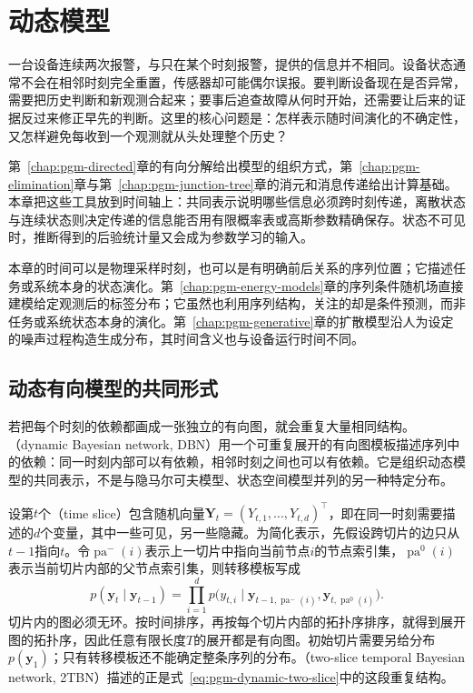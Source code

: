 \chapter{动态模型}
\label{chap:pgm-dynamic}

一台设备连续两次报警，与只在某个时刻报警，提供的信息并不相同。设备状态通常不会在相邻时刻完全重置，传感器却可能偶尔误报。要判断设备现在是否异常，需要把历史判断和新观测合起来；要事后追查故障从何时开始，还需要让后来的证据反过来修正早先的判断。这里的核心问题是：怎样表示随时间演化的不确定性，又怎样避免每收到一个观测就从头处理整个历史？

第~\ref{chap:pgm-directed}章的有向分解给出模型的组织方式，第~\ref{chap:pgm-elimination}章与第~\ref{chap:pgm-junction-tree}章的消元和消息传递给出计算基础。本章把这些工具放到时间轴上：共同表示说明哪些信息必须跨时刻传递，离散状态与连续状态则决定传递的信息能否用有限概率表或高斯参数精确保存。状态不可见时，推断得到的后验统计量又会成为参数学习的输入。

本章的时间可以是物理采样时刻，也可以是有明确前后关系的序列位置；它描述任务或系统本身的状态演化。第~\ref{chap:pgm-energy-models}章的序列条件随机场直接建模给定观测后的标签分布；它虽然也利用序列结构，关注的却是条件预测，而非任务或系统状态本身的演化。第~\ref{chap:pgm-generative}章的扩散模型沿人为设定的噪声过程构造生成分布，其时间含义也与设备运行时间不同。

\section{动态有向模型的共同形式}
\label{sec:pgm-dynamic-common}

若把每个时刻的依赖都画成一张独立的有向图，就会重复大量相同结构。（dynamic Bayesian network, DBN）用一个可重复展开的有向图模板描述序列中的依赖：同一时刻内部可以有依赖，相邻时刻之间也可以有依赖。它是组织动态模型的共同表示，不是与隐马尔可夫模型、状态空间模型并列的另一种特定分布。

设第$t$个（time slice）包含随机向量$\bm{Y}_t=(Y_{t,1},\ldots,Y_{t,d})^\top$，即在同一时刻需要描述的$d$个变量，其中一些可见，另一些隐藏。为简化表示，先假设跨切片的边只从$t-1$指向$t$。令$\operatorname{pa}^{-}(i)$表示上一切片中指向当前节点$i$的节点索引集，$\operatorname{pa}^{0}(i)$表示当前切片内部的父节点索引集，则转移模板写成
\begin{equation}
  p(\bm{y}_t\mid\bm{y}_{t-1})
  =\prod_{i=1}^{d}
    p\bigl(y_{t,i}\mid
      \bm{y}_{t-1,\operatorname{pa}^{-}(i)},
      \bm{y}_{t,\operatorname{pa}^{0}(i)}\bigr).
  \label{eq:pgm-dynamic-two-slice}
\end{equation}
切片内的图必须无环。按时间排序，再按每个切片内部的拓扑序排序，就得到展开图的拓扑序，因此任意有限长度$T$的展开都是有向图。初始切片需要另给分布$p(\bm{y}_1)$；只有转移模板还不能确定整条序列的分布。（two-slice temporal Bayesian network, 2TBN）描述的正是式~\eqref{eq:pgm-dynamic-two-slice}中的这段重复结构。

